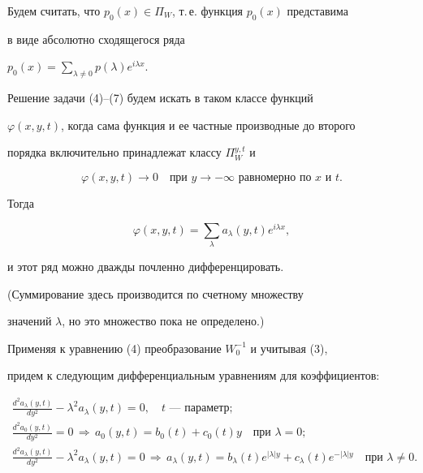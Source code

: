 Будем считать, что $p_0(x)\in\Pi_W$, т.\,е. функция $p_0(x)$ представима 


в виде абсолютно сходящегося ряда 


$p_0(x)=\sum\limits_{\lambda\ne0}p(\lambda)e^{i\lambda x}$. 


 


Решение задачи (4)--(7) будем искать в таком классе функций 


$\varphi(x,y,t)$, когда сама функция и ее частные производные до второго 


порядка включительно принадлежат классу $\Pi^{y,t}_W$ и 


\begin{equation} 


\varphi(x,y,t)\to0\quad 


\text{при $y\to-\infty$ равномерно по $x$ и $t$}. 


\end{equation} 


Тогда 


\begin{equation} 


\varphi(x,y,t)=\sum_\lambda a_\lambda(y,t)e^{i\lambda x}, 


\end{equation} 


и этот ряд можно дважды почленно дифференцировать. 


(Суммирование здесь производится по счетному множеству 


значений $\lambda$, но это множество пока не определено.) 


 


Применяя к уравнению (4) преобразование $W^{-1}_0$ и учитывая (3), 


придем к следующим дифференциальным уравнениям для коэффициентов: 


\begin{gather*} 


\frac{d^2a_\lambda(y,t)}{d y^2}-\lambda^2 a_\lambda(y,t)=0, 


\quad \text{$t$ --- параметр}; \\ 


% 


\frac{d^2a_0(y,t)}{d y^2}=0\,\Rightarrow\, 


a_0(y,t)=b_0(t)+c_0(t)y\quad 


\text{при $\lambda=0$}; \\ 


% 


\frac{d^2a_\lambda(y,t)}{d y^2}-\lambda^2a_\lambda(y,t)=0 


\,\Rightarrow\, a_\lambda(y,t)=b_\lambda(t)e^{|\lambda|y}+ 


c_\lambda(t)e^{-|\lambda|y}\quad 


\text{при $\lambda\ne0$}. 


\end{gather*} 


